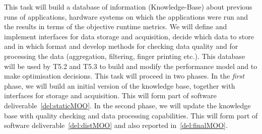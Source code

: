 \begin{Workpackage}{\thewpno}
\begin{Task}
This task will build a database of information (Knowledge-Base) about previous runs of applications, hardware systems on which the applications were run and the results in terms of the objective runtime metrics. We will define and implement interfaces for data storage and acquisition, decide which data to store and in which format and develop methods for checking data quality and for processing the data (aggregation, filtering, finger printing etc.). This database will be used by T5.2 and T5.3 to
build and modify the performance model and to make optimisation decisions. This task will proceed 
in two phases. In the \emph{first} phase, we will build an initial version of the knowledge base, 
together with interfaces for storage and acquisition. This will form part of software deliverable~\ref{del:staticMOO}. In the 
second phase, we will update the knowledge base with quality checking and data processing
capabilities. This will form part of software deliverable~\ref{del:distMOO} and also reported in~\ref{del:finalMOO}.




\end{Task}
\end{Workpackage}
